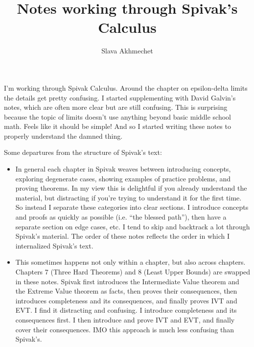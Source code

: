 \documentclass{article}
\title{Notes working through Spivak's Calculus}
\author{Slava Akhmechet}
\begin{document}
\maketitle

I'm working through Spivak Calculus. Around the chapter on
epsilon-delta limits the details get pretty confusing. I started
supplementing with David Galvin's notes, which are often more clear
but are still confusing. This is surprising because the topic of
limits doesn't use anything beyond basic middle school math. Feels
like it should be simple! And so I started writing these notes to
properly understand the damned thing.

\vs

Some departures from the structure of Spivak's text:
\begin{itemize}
\item In general each chapter in Spivak weaves between introducing
  concepts, exploring degenerate cases, showing examples of practice
  problems, and proving theorems. In my view this is delightful if you
  already understand the material, but distracting if you're trying to
  understand it for the first time. So instead I separate these
  categories into clear sections. I introduce concepts and proofs as
  quickly as possible (i.e. ``the blessed path''), then have a
  separate section on edge cases, etc. I tend to skip and backtrack a
  lot through Spivak's material. The order of these notes reflects the
  order in which I internalized Spivak's text.
\item This sometimes happens not only within a chapter, but also
  across chapters. Chapters 7 (Three Hard Theorems) and 8 (Least Upper
  Bounds) are swapped in these notes. Spivak first introduces the
  Intermediate Value theorem and the Extreme Value theorem as facts,
  then proves their consequences, then introduces completeness and its
  consequences, and finally proves IVT and EVT. I find it distracting
  and confusing. I introduce completeness and its consequences first.
  I then introduce and prove IVT and EVT, and finally cover their
  consequences. IMO this approach is much less confusing than
  Spivak's.
\end{itemize}

\clearpage
\tableofcontents

\clearpage

\clearpage

\clearpage

\clearpage

\clearpage

\clearpage

\clearpage

\clearpage

\clearpage

\end{document}
